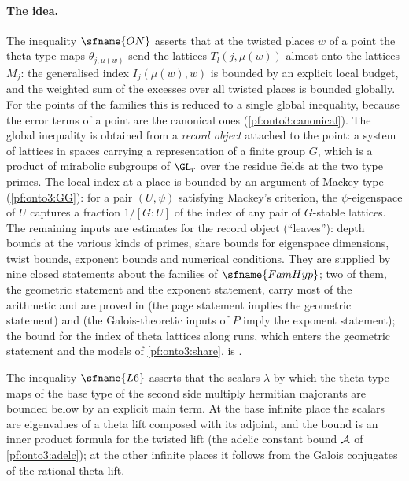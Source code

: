 \paragraph{The idea.}
The inequality $\sfname{ON}$ asserts that at the twisted places $w$ of a point the theta-type maps
$\theta_{j,\mu(w)}$ send the lattices $T_l(j,\mu(w))$ almost onto the lattices $M_j$: the generalised index
$I_j(\mu(w),w)$ is bounded by an explicit local budget, and the weighted sum of the excesses over all twisted
places is bounded globally. For the points of the families this is reduced to a single global inequality,
because the error terms of a point are the canonical ones (\cref{pf:onto3:canonical}). The global inequality is
obtained from a \emph{record object} attached to the point: a system of lattices in spaces carrying a
representation of a finite group $G$, which is a product of mirabolic subgroups of $\GL_r$ over the residue fields
at the two type primes. The local index at a place is bounded by an argument of Mackey type
(\cref{pf:onto3:GG}): for a pair $(U,\psi)$ satisfying Mackey's criterion, the $\psi$-eigenspace of $U$ captures
a fraction $1/[G:U]$ of the index of any pair of $G$-stable lattices. The remaining inputs are estimates for the
record object (``leaves''): depth bounds at the various kinds of primes, share bounds for eigenspace dimensions,
twist bounds, exponent bounds and numerical conditions. They are supplied by nine closed statements about the
families of $\sfname{FamHyp}$; two of them, the geometric statement and the exponent statement, carry most of the
arithmetic and are proved in  (the page statement implies the
geometric statement) and  (the Galois-theoretic
inputs of $P$ imply the exponent statement); the bound for the index of theta lattices along runs, which enters the
geometric statement and the models of \cref{pf:onto3:share}, is .

The inequality $\sfname{L6}$ asserts that the scalars $\lambda$ by which the theta-type maps of the base type of
the second side multiply hermitian majorants are bounded below by an explicit main term. At the base infinite
place the scalars are eigenvalues of a theta lift composed with its adjoint, and the bound is an inner product
formula for the twisted lift (the adelic constant bound $\mathcal{A}$ of \cref{pf:onto3:adelc}); at the other
infinite places it follows from the Galois conjugates of the rational theta lift.

